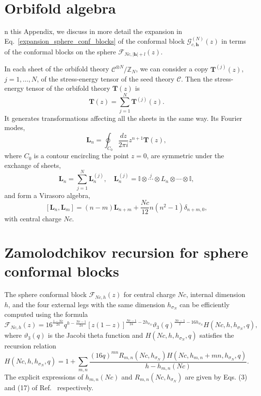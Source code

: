 \documentclass[a4paper,11pt]{article}
\begin{document}
\section{Orbifold algebra}

n this Appendix, we discuss in more detail the expansion in Eq.~\eqref{expansion_sphere_conf_blocks} of the
conformal block $\mathcal{G}_{c, \boldsymbol{h}}^{(N)}(z)$ in terms of the conformal 
blocks on the sphere $\mathcal{F}_{Nc, |\boldsymbol{h}|+l}(z)$.

In each sheet of the orbifold theory $\mathcal{C}^{\otimes N}/\mathbb{Z}_N$, we 
can consider a copy $\boldsymbol{T}^{(j)}(z)$, $j=1,\dots, N$, of the stress-energy tensor of 
the seed theory $\mathcal{C}$. Then the stress-energy tensor of the 
orbifold theory $\boldsymbol{T}(z)$ is 
\begin{equation}\label{hatT}
 \boldsymbol{T}(z)=\sum_{j=1}^N \boldsymbol{T}^{(j)}(z).
\end{equation}
It generates transformations affecting all the sheets in the same way. 
Its Fourier modes,
\begin{equation}
 \boldsymbol{L}_n=\oint_{C_0}\frac{dz}{2\pi i} z^{n+1}\boldsymbol{T}(z),
\end{equation}
where $C_0$ is a contour encircling the point $z=0$, are symmetric 
under the exchange of sheets, 
\begin{equation}
 \boldsymbol{L}_n=\sum_{j=1}^N \boldsymbol{L}_n^{(j)}, \quad 
 \boldsymbol{L}_n^{(j)}=\mathbb{I}\otimes \overset{j}{\cdots} \otimes L_{n}\otimes \cdots \otimes \mathbb{I},
\end{equation}
and form a Virasoro algebra, 
\begin{equation}\label{symm_virasoro_alg}
 [\boldsymbol{L}_n, \boldsymbol{L}_{m}]=(n-m)\boldsymbol{L}_{n+m}+\frac{Nc}{12}n(n^2-1)\delta_{n+m, 0},
\end{equation}
with central charge $Nc$.
\section{Zamolodchikov recursion for sphere conformal blocks}\label{app_zamolodchikov}
The sphere conformal block $\mathcal{F}_{Nc, h}(z)$
for central charge $Nc$, internal dimension $h$, and the four
external legs with the same dimension $h_{\sigma_N}$ can be efficiently computed 
using the formula \cite{Zamolodchikov}
\begin{equation}
 \mathcal{F}_{Nc, h}(z)=
 16^{\frac{1-Nc}{24}}q^{h-\frac{Nc-1}{24}}
 [z(1-z)]^{\frac{Nc-1}{24}-2h_{\sigma_N}}
 \vartheta_3(q)^{\frac{Nc-1}{2}-16h_{\sigma_N}}H(Nc, h, h_{\sigma_N}, q),
\end{equation}
where $\vartheta_3(q)$ is the Jacobi theta function and $H(Nc, h, h_{\sigma_N}, q)$
satisfies the recursion relation 
\begin{equation}
 H(Nc, h, h_{\sigma_N}, q)=
 1+\sum_{m, n}\frac{(16q)^{mn}R_{m,n}(Nc, h_{\sigma_N})H(Nc, h_{m,n}+mn, h_{\sigma_N}, q)}
 {h-h_{m,n}(Nc)}.
\end{equation}
The explicit expressions of $h_{m,n}(Nc)$ and $R_{m, n}(Nc, h_{\sigma_N})$
are given by Eqs. (3) and (17) of Ref.~\cite{Zamolodchikov} respectively.  
\end{document}
